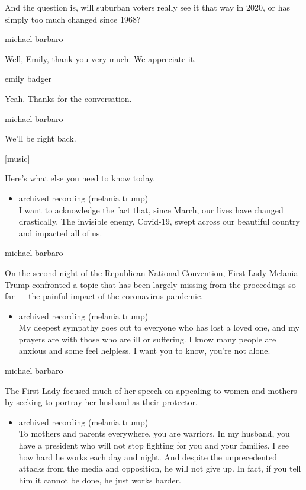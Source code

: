 And the question is, will suburban voters really see it that way in
2020, or has simply too much changed since 1968?

michael barbaro

Well, Emily, thank you very much. We appreciate it.

emily badger

Yeah. Thanks for the conversation.

michael barbaro

We'll be right back.

{[}music{]}

Here's what else you need to know today.

\begin{itemize}
\tightlist
\item
  archived recording (melania trump)\\
  I want to acknowledge the fact that, since March, our lives have
  changed drastically. The invisible enemy, Covid-19, swept across our
  beautiful country and impacted all of us.
\end{itemize}

michael barbaro

On the second night of the Republican National Convention, First Lady
Melania Trump confronted a topic that has been largely missing from the
proceedings so far --- the painful impact of the coronavirus pandemic.

\begin{itemize}
\tightlist
\item
  archived recording (melania trump)\\
  My deepest sympathy goes out to everyone who has lost a loved one, and
  my prayers are with those who are ill or suffering. I know many people
  are anxious and some feel helpless. I want you to know, you're not
  alone.
\end{itemize}

michael barbaro

The First Lady focused much of her speech on appealing to women and
mothers by seeking to portray her husband as their protector.

\begin{itemize}
\tightlist
\item
  archived recording (melania trump)\\
  To mothers and parents everywhere, you are warriors. In my husband,
  you have a president who will not stop fighting for you and your
  families. I see how hard he works each day and night. And despite the
  unprecedented attacks from the media and opposition, he will not give
  up. In fact, if you tell him it cannot be done, he just works harder.
\end{itemize}


